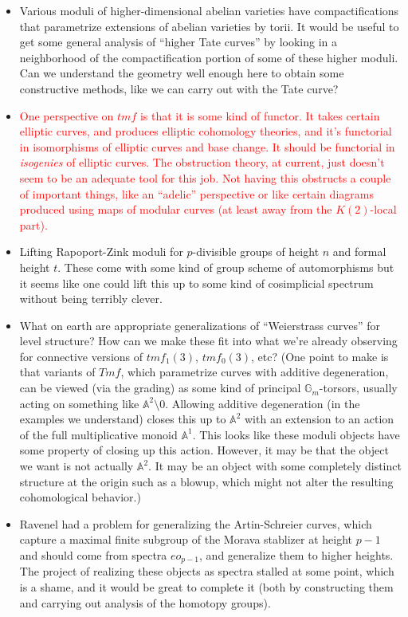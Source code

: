 \documentclass[12pt,titlepage]{article}
\newcommand{\rd}[1]{{\textcolor{red}{#1}}}
\theoremstyle{plain}
\theoremstyle{definition}
\theoremstyle{remark}
\begin{document}
\begin{itemize}
\item Various moduli of higher-dimensional abelian varieties have compactifications that parametrize extensions of abelian varieties by torii. It would be useful to get some general analysis of ``{}higher Tate curves''{} by looking in a neighborhood of the compactification portion of some of these higher moduli. Can we understand the geometry well enough here to obtain some constructive methods, like we can carry out with the Tate curve?


\item \rd{One perspective on $tmf$ is that it is some kind of functor. It takes certain elliptic curves, and produces elliptic cohomology theories, and it'{}s functorial in isomorphisms of elliptic curves and base change. It should be functorial in \emph{isogenies} of elliptic curves. The obstruction theory, at current, just doesn'{}t seem to be an adequate tool for this job. Not having this obstructs a couple of important things, like an ``{}adelic''{} perspective or like certain diagrams produced using maps of modular curves (at least away from the $K(2)$-local part).}


\item Lifting Rapoport-Zink moduli for $p$-divisible groups of height $n$ and formal height $t$. These come with some kind of group scheme of automorphisms but it seems like one could lift this up to some kind of cosimplicial spectrum without being terribly clever.


\item What on earth are appropriate generalizations of ``{}Weierstrass curves''{} for level structure? How can we make these fit into what we'{}re already observing for connective versions of $tmf_1(3)$, $tmf_0(3)$, etc? (One point to make is that variants of $Tmf$, which parametrize curves with additive degeneration, can be viewed (via the grading) as some kind of principal $\mathbb{G}_m$-torsors, usually acting on something like $\mathbb{A}^2 \setminus 0$. Allowing additive degeneration (in the examples we understand) closes this up to $\mathbb{A}^2$ with an extension to an action of the full multiplicative monoid $\mathbb{A}^1$. This looks like these moduli objects have some property of closing up this action. However, it may be that the object we want is not actually $\mathbb{A}^2$. It may be an object with some completely distinct structure at the origin such as a blowup, which might not alter the resulting cohomological behavior.)


\item Ravenel had a problem for generalizing the Artin-Schreier curves, which capture a maximal finite subgroup of the Morava stablizer at height $p-1$ and should come from spectra $eo_{p-1}$, and generalize them to higher heights. The project of realizing these objects as spectra stalled at some point, which is a shame, and it would be great to complete it (both by constructing them and carrying out analysis of the homotopy groups).



\end{itemize}
\end{document}
